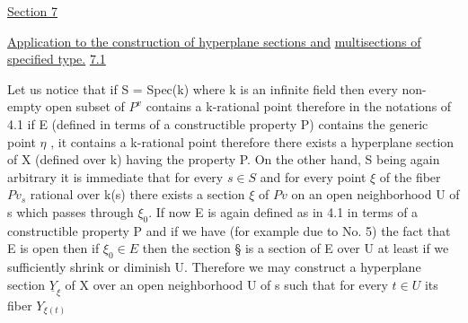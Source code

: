 \documentclass[11pt]{article}
\newcommand{\scanpage}[1]{\par\bigskip\noindent{\small\sffamily[scan #1]}\par}
\newcommand{\mspage}[1]{{\small\sffamily[p.\,#1]}}
\newcommand{\uline}[1]{\underline{#1}}
\begin{document}
\uline{Section 7}

\uline{Application to the construction of hyperplane sections and}
\uline{multisections of specified type.}
\uline{7.1}

Let us notice that if S = Spec(k) where  k  is an infinite
field then every non-empty open subset of $P^{v}$ contains a k-rational
point therefore in the notations of 4.1 if E (defined in terms of
a constructible property P) contains the generic point $\eta$ , it
contains a k-rational point therefore there exists a hyperplane
section of X (defined over k) having the property P. On the other
hand, S being again arbitrary it is immediate that for every $s\in S$
and for every point $\xi$ of the fiber $Pv_{s}$ rational over k(s) there
exists a section $\xi$ of $Pv$ on an open neighborhood U of s which
passes through $\xi_{0}$.  If now E is again defined as in 4.1 in terms of
a constructible property P and if we have (for example due to No.
5) the fact that E is open then if $\xi_{0} \in E$ then the section \S{} is a
section of E over U at least if we sufficiently shrink or diminish
U.  Therefore we may construct a hyperplane section $\underline{Y}_{\xi}$ of X over an
open neighborhood U of s such that for every $t \in U$ its fiber $Y_{\xi(t)}$

\clearpage
\scanpage{24/32}
\mspage{32}
\end{document}

